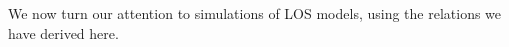 We now turn our attention to simulations of LOS models, using the relations we have derived here.
  